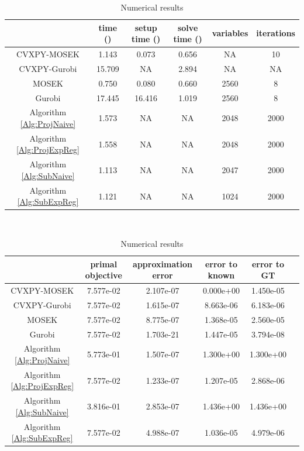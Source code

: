 \documentclass[english]{pkupaper}
\begin{document}
\begin{table}[htbp]
\centering
\begin{tabular}{|c|c|c|c|c|c|}
\hline
& time (\Si{\second}) & setup time (\Si{\second}) & solve time (\Si{\second}) & variables & iterations \\ \hline
CVXPY-MOSEK & 1.143 & 0.073 & 0.656 & NA & 10  \\ \hline
CVXPY-Gurobi & 15.709 & NA & 2.894 & NA & NA \\ \hline
MOSEK & 0.750 & 0.080 & 0.660 & 2560 & 8 \\ \hline
Gurobi & 17.445 & 16.416 & 1.019 & 2560 & 8 \\ \hline
Algorithm \ref{Alg:ProjNaive} & 1.573 & NA & NA & 2048 & 2000 \\ \hline
Algorithm \ref{Alg:ProjExpReg} & 1.558 & NA & NA & 2048 & 2000 \\ \hline
Algorithm \ref{Alg:SubNaive} & 1.113 & NA & NA & 2047 & 2000 \\ \hline
Algorithm \ref{Alg:SubExpReg} & 1.121 & NA & NA & 1024 & 2000 \\ \hline
\end{tabular}

\ 

\begin{tabular}{|c|c|c|c|c|c|}
\hline
& primal objective & approximation error & error to known & error to GT \\ \hline
CVXPY-MOSEK & 7.577e-02 & 2.107e-07 & 0.000e+00 & 1.450e-05 \\ \hline
CVXPY-Gurobi & 7.577e-02 & 1.615e-07 & 8.663e-06 & 6.183e-06 \\ \hline
MOSEK & 7.577e-02 & 8.775e-07 & 1.368e-05 & 2.560e-05 \\ \hline
Gurobi & 7.577e-02 & 1.703e-21 & 1.447e-05 & 3.794e-08 \\ \hline
Algorithm \ref{Alg:ProjNaive} & 5.773e-01 & 1.507e-07 & 1.300e+00 & 1.300e+00 \\ \hline
Algorithm \ref{Alg:ProjExpReg} & 7.577e-02 & 1.233e-07 & 1.207e-05 & 2.868e-06 \\ \hline
Algorithm \ref{Alg:SubNaive} & 3.816e-01 & 2.853e-07 & 1.436e+00 & 1.436e+00 \\ \hline
Algorithm \ref{Alg:SubExpReg} & 7.577e-02 & 4.988e-07 & 1.036e-05 & 4.979e-06 \\ \hline
\end{tabular}

\caption{Numerical results} \label{Tbl:NumRes}
\end{table}
\end{document}
